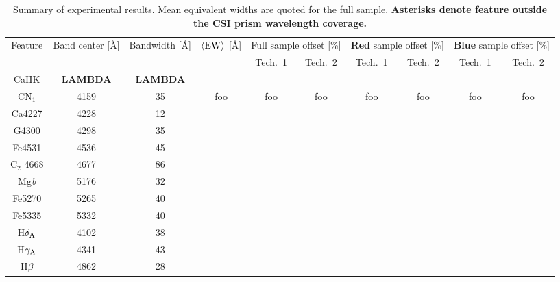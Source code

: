 \documentclass[a4paper,fleqn,usenatbib]{mnras}
\newcommand{\bfr}{\bf\color{red}}
\begin{document}
\begin{table}
	\centering
	\caption{Summary of experimental results. Mean equivalent widths are quoted for the full sample.
			{\bfr Asterisks denote feature outside the CSI prism wavelength coverage.}}
	\label{tbl:stats}
	\begin{tabular}{cccccccccc} %
		\hline
	Feature & Band center [\AA] & Bandwidth [\AA] & $\langle{\rm EW}\rangle$ [\AA] & 
	\multicolumn{2}{c}{Full sample offset [\%]} & 
	\multicolumn{2}{c}{{\bfr Red} sample offset [\%]} & 
	\multicolumn{2}{c}{{\bfr Blue} sample offset [\%]}\\
	& & & & Tech.~1 & Tech.~2 & Tech.~1 & Tech.~2 & Tech.~1 & Tech.~2\\
		\hline
	CaHK & {\bfr LAMBDA} & {\bfr LAMBDA}\\
	CN$_{1}$    & 4159 & 35 & foo & foo & foo & foo & foo & foo & foo \\
	Ca4227 & 4228 & 12\\
	G4300  & 4298 & 35\\
	Fe4531 & 4536 & 45\\
	C$_{2}$ 4668 & 4677 & 86\\
	Mg{\it b}    & 5176 & 32\\
	Fe5270 & 5265 & 40\\
	Fe5335 & 5332 & 40\\
		\hline
	H$\delta_{\rm A}$    & 4102 & 38\\
	H$\gamma_{\rm A}$    & 4341 & 43\\
	H$\beta$     & 4862 & 28\\
		\hline
	\end{tabular}
\end{table}

\end{document}
